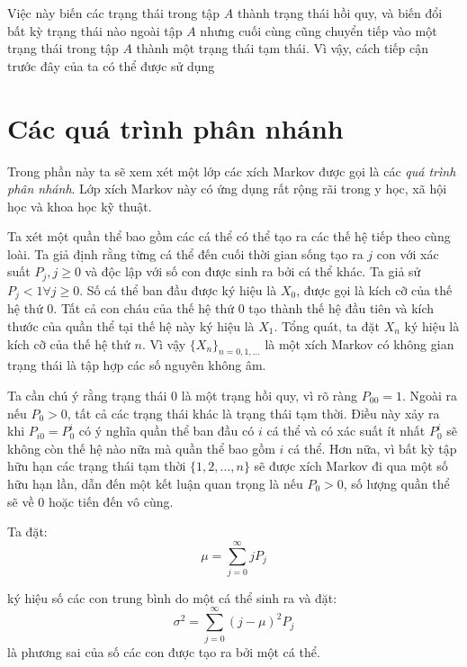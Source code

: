 \documentclass[14pt, a4paper]{article}
\numberwithin{equation}{section}
\numberwithin{figure}{section}
\theoremstyle{sltheorem}
\theoremstyle{soltheorem}
\numberwithin{dl}{section}
\numberwithin{vd}{section}
\begin{document}
    Việc này biến các trạng thái trong tập $A$ thành trạng thái hồi quy, và biến đổi bất kỳ trạng thái nào ngoài tập $A$ nhưng cuối cùng cũng chuyển tiếp vào một trạng thái trong tập $A$ thành một trạng thái tạm thái.
    Vì vậy, cách tiếp cận trước đây của ta có thể được sử dụng
    
    \section{Các quá trình phân nhánh}
    
    Trong phần này ta sẽ xem xét một lớp các xích Markov được gọi là các \textit{quá trình phân nhánh}.
    Lớp xích Markov này có ứng dụng rất rộng rãi trong y học, xã hội học và khoa học kỹ thuật.
    
    Ta xét một quần thể bao gồm các cá thể có thể tạo ra các thế hệ tiếp theo cùng loài.
    Ta giả định rằng từng cá thể đến cuối thời gian sống tạo ra $j$ con với xác suất $P_j, j \geq 0$ và độc lập với số con được sinh ra bởi cá thể khác.
    Ta giả sử $P_j < 1 \forall j \geq 0$.
    Số cá thể ban đầu được ký hiệu là $X_0$, được gọi là kích cỡ của thế hệ thứ 0.
    Tất cả con cháu của thế hệ thứ 0 tạo thành thế hệ đầu tiên và kích thước của quần thể tại thế hệ này ký hiệu là $X_1$.
    Tổng quát, ta đặt $X_n$ ký hiệu là kích cỡ của thế hệ thứ $n$.
    Vì vậy $\lbrace X_n \rbrace_{n=0,1,\dots}$ là một xích Markov có không gian trạng thái là tập hợp các số nguyên không âm.
    
    Ta cần chú ý rằng trạng thái 0 là một trạng hồi quy, vì rõ ràng $P_{00}=1$.
    Ngoài ra nếu $P_0 > 0$, tất cả các trạng thái khác là trạng thái tạm thời.
    Điều này xảy ra khi $P_{i0}=P_0^i$ có ý nghĩa quần thể ban đầu có $i$ cá thể và có xác suất ít nhất $P_0^i$ sẽ không còn thế hệ nào nữa mà quần thể bao gồm $i$ cá thể.
    Hơn nữa, vì bất kỳ tập hữu hạn các trạng thái tạm thời $\lbrace 1, 2, \dots, n \rbrace$ sẽ được xích Markov đi qua một số hữu hạn lần, dẫn đến một kết luận quan trọng là nếu $P_0 > 0$, số lượng quần thể sẽ về 0 hoặc tiến đến vô cùng.
    
    Ta đặt:
    \begin{equation*}
        \mu = \sum_{j=0}^{\infty} j P_j
    \end{equation*}
    
    ký hiệu số các con trung bình do một cá thể sinh ra và đặt:
    \begin{equation*}
        \sigma^2 = \sum_{j=0}^{\infty} (j - \mu)^2 P_j
    \end{equation*}
    là phương sai của số các con được tạo ra bởi một cá thể.
    
\end{document}
